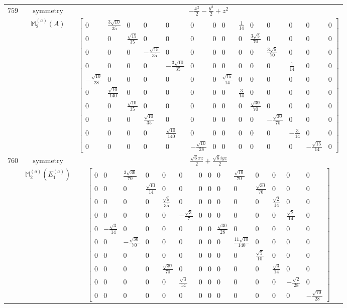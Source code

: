 \documentclass[fleqn,8pt,landscape]{jsarticle}
\begin{document}
\begin{longtable}{ccc}
$ 759 $ & $ \text{symmetry} $ & $ - \frac{x^{2}}{2} - \frac{y^{2}}{2} + z^{2} $ \\
$  $ & $ \mathbb{M}_{2}^{(a)}(A) $ & $ \begin{bmatrix} 0 & \frac{3 \sqrt{10}}{35} & 0 & 0 & 0 & 0 & 0 & 0 & \frac{1}{14} & 0 & 0 & 0 & 0 & 0 \\ 0 & 0 & \frac{\sqrt{15}}{35} & 0 & 0 & 0 & 0 & 0 & 0 & \frac{3 \sqrt{5}}{70} & 0 & 0 & 0 & 0 \\ 0 & 0 & 0 & - \frac{\sqrt{15}}{35} & 0 & 0 & 0 & 0 & 0 & 0 & \frac{3 \sqrt{5}}{70} & 0 & 0 & 0 \\ 0 & 0 & 0 & 0 & - \frac{3 \sqrt{10}}{35} & 0 & 0 & 0 & 0 & 0 & 0 & \frac{1}{14} & 0 & 0 \\ - \frac{\sqrt{10}}{28} & 0 & 0 & 0 & 0 & 0 & 0 & \frac{\sqrt{15}}{14} & 0 & 0 & 0 & 0 & 0 & 0 \\ 0 & \frac{\sqrt{10}}{140} & 0 & 0 & 0 & 0 & 0 & 0 & \frac{3}{14} & 0 & 0 & 0 & 0 & 0 \\ 0 & 0 & \frac{\sqrt{10}}{35} & 0 & 0 & 0 & 0 & 0 & 0 & \frac{\sqrt{30}}{70} & 0 & 0 & 0 & 0 \\ 0 & 0 & 0 & \frac{\sqrt{10}}{35} & 0 & 0 & 0 & 0 & 0 & 0 & - \frac{\sqrt{30}}{70} & 0 & 0 & 0 \\ 0 & 0 & 0 & 0 & \frac{\sqrt{10}}{140} & 0 & 0 & 0 & 0 & 0 & 0 & - \frac{3}{14} & 0 & 0 \\ 0 & 0 & 0 & 0 & 0 & - \frac{\sqrt{10}}{28} & 0 & 0 & 0 & 0 & 0 & 0 & - \frac{\sqrt{15}}{14} & 0 \end{bmatrix} $ \\ \hline
$ 760 $ & $ \text{symmetry} $ & $ \frac{\sqrt{6} x z}{2} + \frac{\sqrt{6} i y z}{2} $ \\
$  $ & $ \mathbb{M}_{2}^{(a)}(E_{1}^{(a)}) $ & $ \begin{bmatrix} 0 & 0 & \frac{3 \sqrt{30}}{70} & 0 & 0 & 0 & 0 & 0 & 0 & \frac{\sqrt{10}}{70} & 0 & 0 & 0 & 0 \\ 0 & 0 & 0 & \frac{\sqrt{10}}{14} & 0 & 0 & 0 & 0 & 0 & 0 & \frac{\sqrt{30}}{70} & 0 & 0 & 0 \\ 0 & 0 & 0 & 0 & \frac{\sqrt{5}}{35} & 0 & 0 & 0 & 0 & 0 & 0 & \frac{\sqrt{2}}{14} & 0 & 0 \\ 0 & 0 & 0 & 0 & 0 & - \frac{\sqrt{3}}{7} & 0 & 0 & 0 & 0 & 0 & 0 & \frac{\sqrt{2}}{14} & 0 \\ 0 & - \frac{\sqrt{3}}{14} & 0 & 0 & 0 & 0 & 0 & 0 & \frac{\sqrt{30}}{28} & 0 & 0 & 0 & 0 & 0 \\ 0 & 0 & - \frac{\sqrt{30}}{70} & 0 & 0 & 0 & 0 & 0 & 0 & \frac{11 \sqrt{10}}{140} & 0 & 0 & 0 & 0 \\ 0 & 0 & 0 & 0 & 0 & 0 & 0 & 0 & 0 & 0 & \frac{\sqrt{5}}{10} & 0 & 0 & 0 \\ 0 & 0 & 0 & 0 & \frac{\sqrt{30}}{70} & 0 & 0 & 0 & 0 & 0 & 0 & \frac{\sqrt{3}}{14} & 0 & 0 \\ 0 & 0 & 0 & 0 & 0 & \frac{\sqrt{3}}{14} & 0 & 0 & 0 & 0 & 0 & 0 & - \frac{\sqrt{2}}{28} & 0 \\ 0 & 0 & 0 & 0 & 0 & 0 & 0 & 0 & 0 & 0 & 0 & 0 & 0 & - \frac{\sqrt{70}}{28} \end{bmatrix} $ \\ \hline

\end{longtable}
\end{document}
